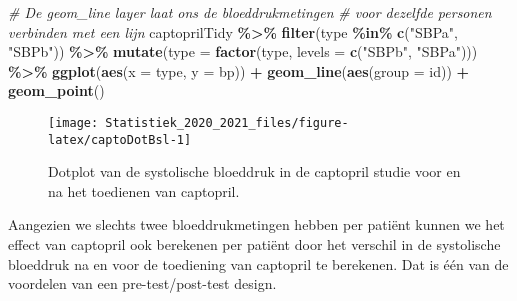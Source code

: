 \documentclass[
  12pt,dutch,coursenotes]{book}
\newenvironment{Shaded}{\begin{snugshade}}{\end{snugshade}}
\newcommand{\CommentTok}[1]{\textcolor[rgb]{0.56,0.35,0.01}{\textit{#1}}}
\newcommand{\DataTypeTok}[1]{\textcolor[rgb]{0.13,0.29,0.53}{#1}}
\newcommand{\KeywordTok}[1]{\textcolor[rgb]{0.13,0.29,0.53}{\textbf{#1}}}
\newcommand{\NormalTok}[1]{#1}
\newcommand{\OperatorTok}[1]{\textcolor[rgb]{0.81,0.36,0.00}{\textbf{#1}}}
\newcommand{\StringTok}[1]{\textcolor[rgb]{0.31,0.60,0.02}{#1}}
\theoremstyle{definition}
\theoremstyle{definition}
\theoremstyle{definition}
\theoremstyle{remark}
\begin{document}
\begin{Shaded}
\begin{Highlighting}[]
\CommentTok{\# De geom\_line layer laat ons de bloeddrukmetingen}
\CommentTok{\# voor dezelfde personen verbinden met een lijn}
\NormalTok{captoprilTidy }\OperatorTok{\%\textgreater{}\%}\StringTok{ }\KeywordTok{filter}\NormalTok{(type }\OperatorTok{\%in\%}\StringTok{ }\KeywordTok{c}\NormalTok{(}\StringTok{"SBPa"}\NormalTok{, }\StringTok{"SBPb"}\NormalTok{)) }\OperatorTok{\%\textgreater{}\%}\StringTok{ }
\StringTok{    }\KeywordTok{mutate}\NormalTok{(}\DataTypeTok{type =} \KeywordTok{factor}\NormalTok{(type, }\DataTypeTok{levels =} \KeywordTok{c}\NormalTok{(}\StringTok{"SBPb"}\NormalTok{, }\StringTok{"SBPa"}\NormalTok{))) }\OperatorTok{\%\textgreater{}\%}\StringTok{ }
\StringTok{    }\KeywordTok{ggplot}\NormalTok{(}\KeywordTok{aes}\NormalTok{(}\DataTypeTok{x =}\NormalTok{ type, }\DataTypeTok{y =}\NormalTok{ bp)) }\OperatorTok{+}\StringTok{ }\KeywordTok{geom\_line}\NormalTok{(}\KeywordTok{aes}\NormalTok{(}\DataTypeTok{group =}\NormalTok{ id)) }\OperatorTok{+}\StringTok{ }
\StringTok{    }\KeywordTok{geom\_point}\NormalTok{()}
\end{Highlighting}
\end{Shaded}

\begin{figure}

{\centering \texttt{[image: Statistiek\_2020\_2021\_files/figure-latex/captoDotBsl-1]} 

}

\caption{Dotplot van de systolische bloeddruk in de captopril studie voor en na het toedienen van captopril.}\label{fig:captoDotBsl}
\end{figure}

Aangezien we slechts twee bloeddrukmetingen hebben per patiënt kunnen we het effect van captopril ook berekenen per patiënt door het verschil in de systolische bloeddruk na en voor de toediening van captopril te berekenen. Dat is één van de voordelen van een pre-test/post-test design.
\end{document}
